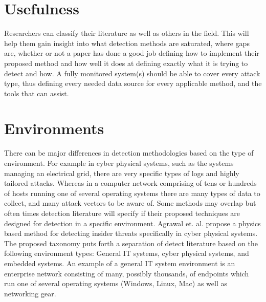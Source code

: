 \documentclass[10pt]{IEEEtran}
\begin{document}
\section{Usefulness}
 Researchers can classify their literature as well as others in the field. This will help them gain insight into what detection methods are saturated, where gaps are, whether or not a paper has done a good job defining how to implement their proposed method and how well it does at defining exactly what it is trying to detect and how. A fully monitored system(s) should be able to cover every attack type, thus defining every needed data source for every applicable method, and the tools that can assist. 

\section{Environments}
 There can be major differences in detection methodologies based on the type of environment. For example in cyber physical systems, such as the systems managing an electrical grid, there are very specific types of logs and highly tailored attacks. Whereas in a computer network comprising of tens or hundreds of hosts running one of several operating systems there are many types of data to collect, and many attack vectors to be aware of. Some methods may overlap but often times detection literature will specify if their proposed techniques are designed for detection in a specific environment. Agrawal et. al. propose a physics based method for detecting insider threats specifically in cyber physical systems\cite{agrawal2018poster}.
The proposed taxonomy puts forth a separation of detect literature based on the following environment types: General IT systems, cyber physical systems, and embedded systems. An example of a general IT system environment is an enterprise network consisting of many, possibly thousands, of endpoints which run one of several operating systems (Windows, Linux, Mac) as well as networking gear. 
\end{document}
